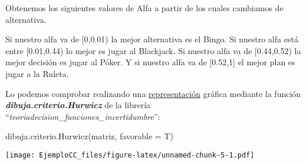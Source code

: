 \documentclass[
]{article}
\newenvironment{Shaded}{\begin{snugshade}}{\end{snugshade}}
\newcommand{\AttributeTok}[1]{\textcolor[rgb]{0.77,0.63,0.00}{#1}}
\newcommand{\FunctionTok}[1]{\textcolor[rgb]{0.00,0.00,0.00}{#1}}
\newcommand{\NormalTok}[1]{#1}
\begin{document}
Obtenemos los siguientes valores de Alfa a partir de los cuales
cambiamos de alternativa.

Si nuestro alfa va de {[}0,0.01) la mejor alternativa es el Bingo. Si
nuestro alfa está entre {[}0.01,0.44) lo mejor es jugar al Blackjack. Si
nuestro alfa va de {[}0.44,0.52) la mejor decisión es jugar al Póker. Y
si nuestro alfa va de {[}0.52,1{]} el mejor plan es jugar a la Ruleta.

Lo podemos comprobar realizando una \underline{representación} gráfica
mediante la función \textbf{\emph{dibuja.criterio.Hurwicz}} de la
librería ``\emph{teoriadecision\_funciones\_incertidumbre}'':

\begin{Shaded}
\begin{Highlighting}[]
\FunctionTok{dibuja.criterio.Hurwicz}\NormalTok{(matriz, }\AttributeTok{favorable =}\NormalTok{ T)}
\end{Highlighting}
\end{Shaded}

\texttt{[image: EjemploCC\_files/figure-latex/unnamed-chunk-5-1.pdf]}
\end{document}
